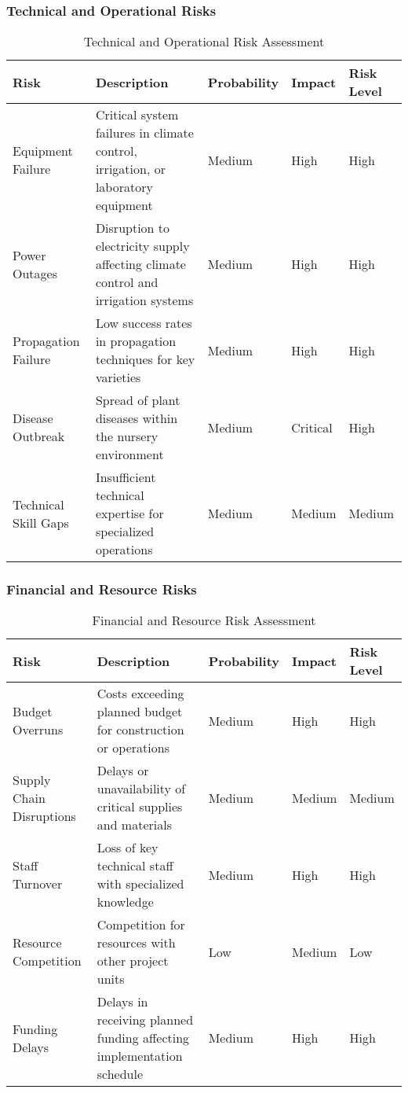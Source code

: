 \subsubsection{Technical and Operational Risks}

\begin{table}[h]
\centering
\begin{tabular}{|p{4cm}|p{4cm}|p{2cm}|p{2cm}|p{3cm}|}
\hline
\textbf{Risk} & \textbf{Description} & \textbf{Probability} & \textbf{Impact} & \textbf{Risk Level} \\
\hline
Equipment Failure & Critical system failures in climate control, irrigation, or laboratory equipment & Medium & High & High \\
\hline
Power Outages & Disruption to electricity supply affecting climate control and irrigation systems & Medium & High & High \\
\hline
Propagation Failure & Low success rates in propagation techniques for key varieties & Medium & High & High \\
\hline
Disease Outbreak & Spread of plant diseases within the nursery environment & Medium & Critical & High \\
\hline
Technical Skill Gaps & Insufficient technical expertise for specialized operations & Medium & Medium & Medium \\
\hline
\end{tabular}
\caption{Technical and Operational Risk Assessment}
\end{table}

\subsubsection{Financial and Resource Risks}

\begin{table}[h]
\centering
\begin{tabular}{|p{4cm}|p{4cm}|p{2cm}|p{2cm}|p{3cm}|}
\hline
\textbf{Risk} & \textbf{Description} & \textbf{Probability} & \textbf{Impact} & \textbf{Risk Level} \\
\hline
Budget Overruns & Costs exceeding planned budget for construction or operations & Medium & High & High \\
\hline
Supply Chain Disruptions & Delays or unavailability of critical supplies and materials & Medium & Medium & Medium \\
\hline
Staff Turnover & Loss of key technical staff with specialized knowledge & Medium & High & High \\
\hline
Resource Competition & Competition for resources with other project units & Low & Medium & Low \\
\hline
Funding Delays & Delays in receiving planned funding affecting implementation schedule & Medium & High & High \\
\hline
\end{tabular}
\caption{Financial and Resource Risk Assessment}
\end{table}

